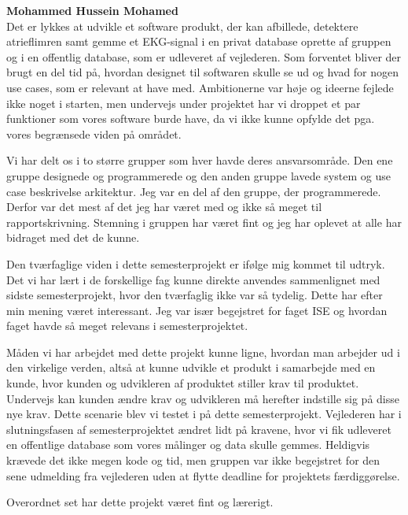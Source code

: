 \textbf{Mohammed Hussein Mohamed}\\
Det er lykkes at udvikle et software produkt, der kan afbillede, detektere atrieflimren samt gemme et EKG-signal i en privat database oprette af gruppen og i en offentlig database, som er udleveret af vejlederen. Som forventet bliver der brugt en del tid på, hvordan designet til softwaren skulle se ud og hvad for nogen use cases, som er relevant at have med. Ambitionerne var høje og ideerne fejlede ikke noget i starten, men undervejs under projektet har vi droppet et par funktioner som vores software burde have, da vi ikke kunne opfylde det pga. vores begrænsede viden på området.

Vi har delt os i to større grupper som hver havde deres ansvarsområde. Den ene gruppe designede og programmerede og den anden gruppe lavede system og use case beskrivelse arkitektur. Jeg var en del af den gruppe, der programmerede. Derfor var det mest af det jeg har været med og ikke så meget til rapportskrivning. Stemning i gruppen har været fint og jeg har oplevet at alle har bidraget med det de kunne.

Den tværfaglige viden i dette semesterprojekt er ifølge mig kommet til udtryk. Det vi har lært i de forskellige fag kunne direkte anvendes sammenlignet med sidste semesterprojekt, hvor den tværfaglig ikke var så tydelig. Dette har efter min mening været interessant. Jeg var især begejstret for faget ISE og hvordan faget havde så meget relevans i semesterprojektet.

Måden vi har arbejdet med dette projekt kunne ligne, hvordan man arbejder ud i den virkelige verden, altså at kunne udvikle et produkt i samarbejde med en kunde, hvor kunden og udvikleren af produktet stiller krav til produktet. Undervejs kan kunden ændre krav og udvikleren må herefter indstille sig på disse nye krav. Dette scenarie blev vi testet i på dette semesterprojekt. Vejlederen har i slutningsfasen af semesterprojektet ændret lidt på kravene, hvor vi fik udleveret en offentlige database som vores målinger og data skulle gemmes.  Heldigvis krævede det ikke megen kode og tid, men gruppen var ikke begejstret for den sene udmelding fra vejlederen uden at flytte deadline for projektets færdiggørelse.

Overordnet set har dette projekt været fint og lærerigt. 


